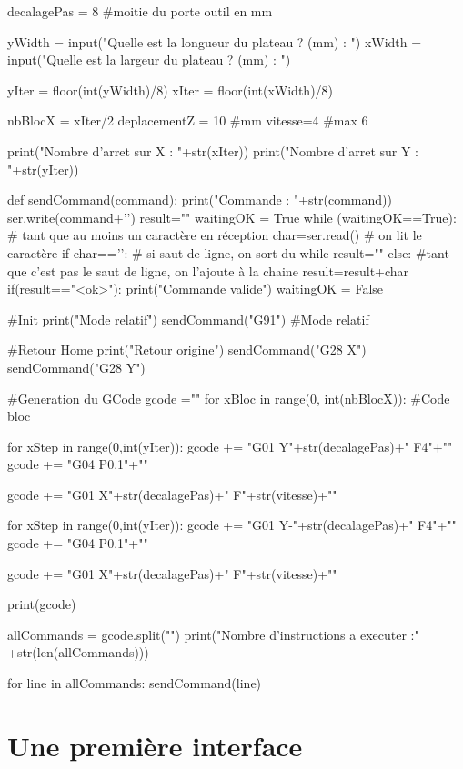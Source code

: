 {\begin{Python}
decalagePas = 8 #moitie du porte outil en mm

yWidth = input("Quelle est la longueur du plateau ? (mm) : ")
xWidth = input("Quelle est la largeur du plateau ? (mm) : ")

yIter = floor(int(yWidth)/8)
xIter = floor(int(xWidth)/8)

nbBlocX = xIter/2
deplacementZ = 10 #mm
vitesse=4 #max 6

print("Nombre d'arret sur X : "+str(xIter))
print("Nombre d'arret sur Y : "+str(yIter))

def sendCommand(command):
    print("Commande : "+str(command))
    ser.write(command+'\n')
    result=""
    waitingOK = True
    while (waitingOK==True): # tant que au moins un caractère en réception
        char=ser.read() # on lit le caractère
        if char=='\n': # si saut de ligne, on sort du while
            result=""
        else: #tant que c'est pas le saut de ligne, on l'ajoute à la chaine 
            result=result+char	
            if(result=="<ok>"):
                print("Commande valide")
                waitingOK = False


#Init
print("Mode relatif")
sendCommand("G91") #Mode relatif

#Retour Home
print("Retour origine")
sendCommand("G28 X")
sendCommand("G28 Y")


#Generation du GCode
gcode =""
for xBloc in range(0, int(nbBlocX)):
    #Code bloc
    
    for xStep in range(0,int(yIter)):
        gcode += "G01 Y"+str(decalagePas)+" F4"+"\n"
        gcode += "G04 P0.1"+"\n"
    
    gcode += "G01 X"+str(decalagePas)+" F"+str(vitesse)+"\n"
    
    for xStep in range(0,int(yIter)):
        gcode += "G01 Y-"+str(decalagePas)+" F4"+"\n"
        gcode += "G04 P0.1"+"\n"
    
    gcode += "G01 X"+str(decalagePas)+" F"+str(vitesse)+"\n"
    

print(gcode)

allCommands = gcode.split("\n")
print("Nombre d'instructions a executer :" +str(len(allCommands)))

for line in allCommands:
    sendCommand(line)
        
 

\end{Python}



\section{Une première interface}

}

